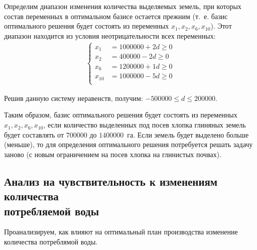 Определим диапазон изменения количества выделяемых земель, при которых состав переменных в оптимальном базисе остается прежним (т.~е. базис оптимального решения будет состоять из переменных $ x_1, x_2, x_6, x_{10} $). Этот диапазон находится из условия неотрицательности всех переменных:
\begin{equation}
	\begin{aligned}
  	\left\{
    	\begin{aligned}
	      x_1 & = 1 000 000 + 2d \ge 0 \\
	      x_2 & = 400 000 - 2d \ge 0\\
	      x_6 & = 1 200 000 + 1d \ge 0 \\
	      x_{10} & = 1 000 000 - 5d \ge 0\\ 
    	\end{aligned}
  	\right.
	\end{aligned}
\end{equation}

Решив данную систему неравенств, получим: $ -500 000 \le d \le 200 000 $.

Таким образом, базис оптимального решения будет состоять из переменных $ x_1, x_2, x_6, x_{10} $, если количество выделенных под посев хлопка глиняных земель будет составлять от $ 700 000 $ до $ 1 400 000 $~га. Если земель будет выделено больше (меньше), то для определения оптимального решения потребуется решать задачу заново (с новым ограничением на посев хлопка на глинистых почвах).



\subsection[Анализ на чувствительность к изменениям количества \\ потребляемой воды]{Анализ на чувствительность к изменениям количества \\ потребляемой воды}

Проанализируем, как влияют на оптимальный план производства изменение количества потреблямой воды.

